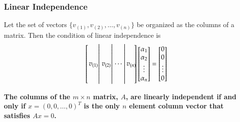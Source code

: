 \documentclass[10pt]{beamer}
\newcommand{\matdim}[2]{\ensuremath{#1\times#2}}
\begin{document}
\begin{frame}
\frametitle{Linear Independence}

Let the set of vectors $\{v_{(1)},v_{(2)},\ldots,v_{(n)}\}$
be organized as the columns of a matrix.  Then the condition
of linear independence is
\begin{equation}      \label{eq:linDepMat}
    \begin{bmatrix}\left. \begin{matrix} \\ \\ v_{(1)}  \\ \\ \\ \end{matrix}\right|
                   \left. \begin{matrix} \\ \\ v_{(2)}  \\ \\ \\ \end{matrix}\right|
                   \left. \begin{matrix} \\ \\ {\cdots\ } \\ \\ \\ \end{matrix}\right|
                          \begin{matrix} \\ \\ v_{(n)}  \\ \\ \\ \end{matrix}\negthickspace
    \end{bmatrix}
    \begin{bmatrix} \alpha_1 \\ \alpha_2 \\ \vdots \\ \alpha_n \end{bmatrix}
    =
    \begin{bmatrix}  0 \\  0 \\ \vdots \\ 0 \end{bmatrix}
\end{equation}

\begin{center}
    \begin{minipage}{4.5in}
        \bfseries
        The columns of the \matdim{m}{n} matrix, $A$, are linearly
        independent if and only if $x=(0,0,\ldots,0)^T$ is the only $n$
        element column vector that satisfies $Ax=0$.
    \end{minipage}
\end{center}


\end{frame}
\end{document}
